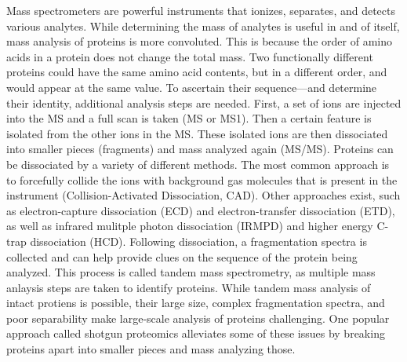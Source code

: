 Mass spectrometers are powerful instruments that ionizes, separates, and detects various analytes. While determining the mass of analytes is useful in and of itself, mass analysis of proteins is more convoluted. This is because the order of amino acids in a protein does not change the total mass. Two functionally different proteins could have the same amino acid contents, but in a different order, and would appear at the same \mz{} value. To ascertain their sequence---and determine their identity, additional analysis steps are needed. First, a set of ions are injected into the MS and a full scan is taken (MS or MS1). Then a certain \mz{} feature is isolated from the other ions in the MS. These isolated ions are then dissociated into smaller pieces (fragments) and mass analyzed again (MS/MS). Proteins can be dissociated by a variety of different methods. The most common approach is to forcefully collide the ions with background gas molecules that is present in the instrument (Collision-Activated Dissociation, CAD). Other approaches exist, such as electron-capture dissociation (ECD)\cite{ecd} and electron-transfer dissociation (ETD)\cite{etd}, as well as infrared mulitple photon dissociation (IRMPD)\cite{irmpd} and higher energy C-trap dissociation (HCD)\cite{hcd}. Following dissociation, a fragmentation spectra is collected and can help provide clues on the sequence of the protein being analyzed. This process is called tandem mass spectrometry, as multiple mass anlaysis steps are taken to identify proteins. While tandem mass analysis of intact protiens is possible, their large size, complex fragmentation spectra, and poor separability make large-scale analysis of proteins challenging. One popular approach called shotgun proteomics alleviates some of these issues by breaking proteins apart into smaller pieces and mass analyzing those.

